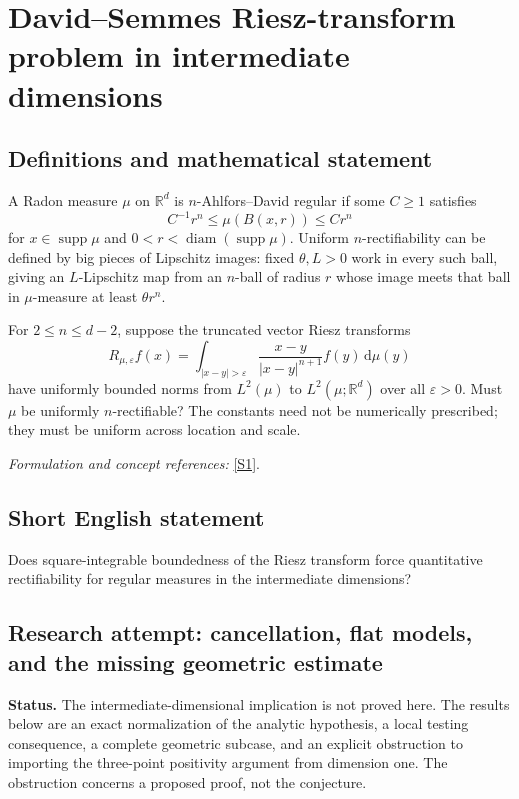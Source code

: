 \documentclass[11pt]{article}
\begin{document}
\section*{\texorpdfstring{David–Semmes Riesz-transform problem in intermediate dimensions}{David–Semmes Riesz-transform problem in intermediate dimensions}}\label{statement}
\subsection{Definitions and mathematical statement}
A Radon measure $\mu$ on ${\mathbb{R}}^d$ is $n$-Ahlfors--David regular if some $C\ge1$ satisfies
\[
 C^{-1}r^n\le\mu(B(x,r))\le Cr^n
\]
for $x\in\operatorname{supp}\mu$ and $0<r<\operatorname{diam}(\operatorname{supp}\mu)$. Uniform $n$-rectifiability can be defined by big pieces of Lipschitz images: fixed $\theta,L>0$ work in every such ball, giving an $L$-Lipschitz map from an $n$-ball of radius $r$ whose image meets that ball in $\mu$-measure at least $\theta r^n$.

For $2\le n\le d-2$, suppose the truncated vector Riesz transforms
\[
 R_{\mu,{\varepsilon}}f(x)=\int_{|x-y|>{\varepsilon}}
 \frac{x-y}{|x-y|^{n+1}}f(y){\,\mathrm{d}}\mu(y)
\]
have uniformly bounded norms from $L^2(\mu)$ to $L^2(\mu;{\mathbb{R}}^d)$ over all ${\varepsilon}>0$. Must $\mu$ be uniformly $n$-rectifiable? The constants need not be numerically prescribed; they must be uniform across location and scale.
\par\smallskip\textit{Formulation and concept references:} \href{https://arxiv.org/html/2509.26547}{[S1]}.

\subsection{Short English statement}
Does square-integrable boundedness of the Riesz transform force quantitative rectifiability for regular measures in the intermediate dimensions?
\subsection{Research attempt: cancellation, flat models, and the missing geometric estimate}
\textbf{Status.} The intermediate-dimensional implication is not proved here. The results below are an exact normalization of the analytic hypothesis, a local testing consequence, a complete geometric subcase, and an explicit obstruction to importing the three-point positivity argument from dimension one. The obstruction concerns a proposed proof, not the conjecture.
\end{document}
